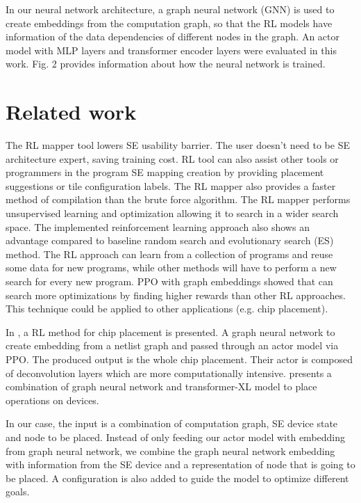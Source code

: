 \documentclass[sigplan,screen]{acmart}
\begin{document}
In our neural network architecture, a graph neural network (GNN) is used to create embeddings from the computation graph, so that the RL models have information of the data dependencies of different nodes in the graph. An actor model with MLP layers and transformer encoder layers were evaluated in this work. Fig. 2 provides information about how the neural network is trained. 

\section{Related work}

The RL mapper tool lowers SE usability barrier. The user doesn’t need to be SE architecture expert, saving training cost. RL tool can also assist other tools or programmers in the program SE mapping creation by providing placement suggestions or tile configuration labels. The RL mapper also provides a faster method of compilation than the brute force algorithm. The RL mapper performs unsupervised learning and optimization allowing it to search in a wider search space. The implemented reinforcement learning approach also shows an advantage compared to baseline random search and evolutionary search (ES) method. The RL approach can learn from a collection of programs and reuse some data for new programs, while other methods will have to perform a new search for every new program. PPO with graph embeddings showed that can search more optimizations by finding higher rewards than other RL approaches. This technique could be applied to other applications (e.g. chip placement). 

In \cite{mirhoseini2020chip}, a RL method for chip placement is presented. A graph neural network to create embedding from a netlist graph and passed through an actor model via PPO. The produced output is the whole chip placement. Their actor is composed of deconvolution layers which are more computationally intensive. \cite{zhou2019gdp} presents a combination of graph neural network and transformer-XL model to place operations on devices. 

In our case, the input is a combination of computation graph, SE device state and node to be placed. Instead of only feeding our actor model with embedding from graph neural network, we combine the graph neural network embedding with information from the SE device and a representation of node that is going to be placed. A configuration is also added to guide the model to optimize different goals.  
\end{document}
